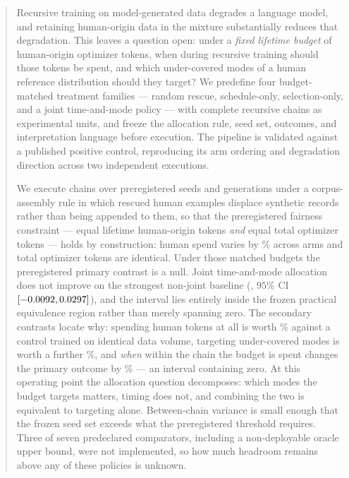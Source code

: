 \begin{abstract}
Recursive training on model-generated data degrades a language model, and retaining
human-origin data in the mixture substantially reduces that degradation. This leaves a
question open: under a \emph{fixed lifetime budget} of human-origin optimizer tokens, when
during recursive training should those tokens be spent, and which under-covered modes of a
human reference distribution should they target? We predefine four budget-matched treatment
families --- random rescue, schedule-only, selection-only, and a joint time-and-mode policy
--- with complete recursive chains as experimental units, and freeze the allocation rule,
seed set, outcomes, and interpretation language before execution. The pipeline is validated
against a published positive control, reproducing its arm ordering and degradation
direction across two independent executions.

We execute \PilotChains{} chains over \PilotSeeds{} preregistered seeds and \PilotHorizon{}
generations under a corpus-assembly rule in which rescued human examples displace synthetic
records rather than being appended to them, so that the preregistered fairness constraint
--- equal lifetime human-origin tokens \emph{and} equal total optimizer tokens --- holds by
construction: human spend varies by \PilotHumanSpreadPct\% across arms and total optimizer
tokens are identical. Under those matched budgets the preregistered primary contrast is a
null. Joint time-and-mode allocation does not improve on the strongest non-joint baseline
(\PilotPrimaryMean{}, $95\%$ CI $[\PilotPrimaryLow, \PilotPrimaryHigh]$), and the interval
lies entirely inside the frozen practical equivalence region rather than merely spanning
zero. The secondary contrasts locate why: spending human tokens at all is worth
\PilotRandNonePct\% against a control trained on identical data volume, targeting
under-covered modes is worth a further \PilotSelRandPct\%, and \emph{when} within the chain
the budget is spent changes the primary outcome by \PilotSchedRandPct\% --- an interval
containing zero. At this operating point the allocation question decomposes: which modes the
budget targets matters, timing does not, and combining the two is equivalent to targeting
alone. Between-chain variance is small enough that the frozen seed set exceeds what the
preregistered threshold requires. Three of seven predeclared comparators, including a
non-deployable oracle upper bound, were not implemented, so how much headroom remains above
any of these policies is unknown.
\end{abstract}

